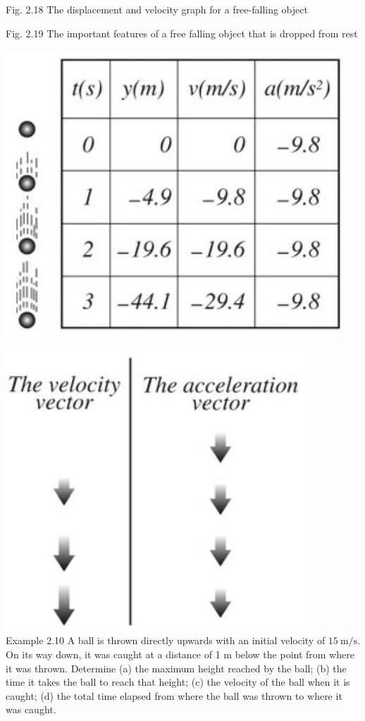 \documentclass[10pt]{article}
\begin{document}
Fig. 2.18 The displacement and velocity graph for a free-falling object

Fig. 2.19 The important features of a free falling object that is dropped from rest

\begin{center}
\includegraphics[max width=\textwidth]{2024_09_13_db1f357d2aad0a03eb2eg-036}
\end{center}

\includegraphics[max width=\textwidth, center]{2024_09_13_db1f357d2aad0a03eb2eg-036(1)}\\
Example 2.10 A ball is thrown directly upwards with an initial velocity of $15 \mathrm{~m} / \mathrm{s}$. On its way down, it was caught at a distance of 1 m below the point from where it was thrown. Determine (a) the maximum height reached by the ball; (b) the time it takes the ball to reach that height; (c) the velocity of the ball when it is caught; (d) the total time elapsed from where the ball was thrown to where it was caught.
\end{document}
